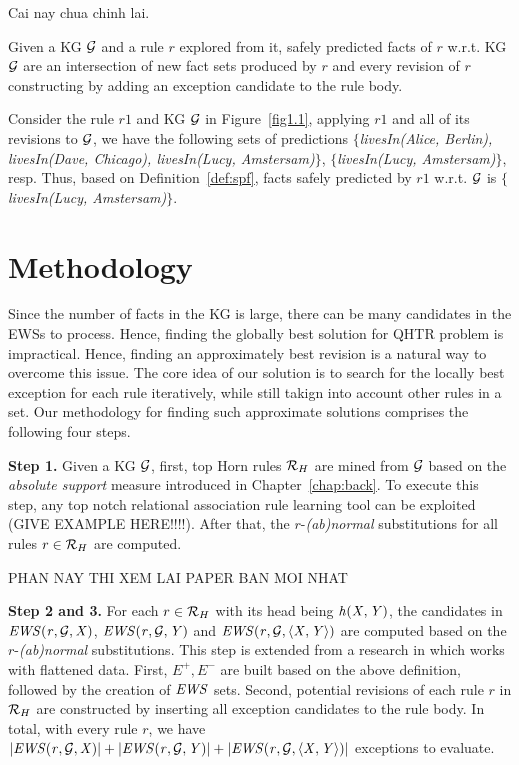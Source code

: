 \begin{definition} \label{def:spf}
Cai nay chua chinh lai.

Given a KG $\mathcal{G}$ and a rule $r$ explored from it, safely predicted facts of $r$ w.r.t. KG $\mathcal{G}$ are an intersection of new fact sets produced by $r$ and every revision of $r$ constructing by adding an exception candidate to the rule body.
\end{definition}

\begin{example}
Consider the rule $r1$ and KG $\mathcal{G}$ in Figure~\ref{fig1.1}, applying $r1$ and all of its revisions to $\mathcal{G}$, we have the following sets of predictions \textit{$\{$livesIn(Alice, Berlin), livesIn(Dave, Chicago), livesIn(Lucy, Amstersam)$\}$}, \textit{$\{$livesIn(Lucy, Amstersam)$\}$}, resp. Thus, based on Definition~\ref{def:spf}, facts safely predicted by $r1$ w.r.t. $\mathcal{G}$ is \textit{$\{$livesIn(Lucy, Amstersam)$\}$}.
\end{example}

\section{Methodology}\label{sec:meth}

Since the number of facts in the KG is large, there can be many candidates in the EWSs to process. Hence, finding the globally best solution for QHTR problem is impractical. Hence, finding an approximately best revision is a natural way to overcome this issue. The core idea of our solution is to search for the locally best exception for each rule iteratively, while still takign into account other rules in a set. Our methodology for finding such approximate solutions comprises the following four steps.
\medskip

\noindent \textbf{Step 1.} Given a KG $\mathcal{G}$, first, top Horn rules $\mathcal{R}_H$ are mined from $\mathcal{G}$ based on the \textit{absolute support} measure introduced in Chapter~\ref{chap:back}. To execute this step, any top notch relational association rule learning tool can be exploited (GIVE EXAMPLE HERE!!!!). After that, the $r$-\emph{(ab)normal} substitutions for all rules $r\in \mathcal{R}_H$ are computed.
\smallskip


PHAN NAY THI XEM LAI PAPER BAN MOI NHAT

\noindent \textbf{Step 2 and 3.} For each $r\in \mathcal{R}_H$ with its head being $\mathit{h(X,Y)}$, the candidates in $\mathit{EWS(r,\mathcal{G},X)}$, $\mathit{EWS(r,\mathcal{G},Y)}$ and $\mathit{EWS(r,\mathcal{G},\langle X,Y\rangle)}$ are computed based on the $r$-\emph{(ab)normal} substitutions. This step is extended from a research in \cite{iswc2016} which works with flattened data. First, $E^+, E^-$ are built based on the above definition, followed by the creation of $\mathit{EWS}$ sets. Second, potential revisions of each rule $r$ in $\mathcal{R}_H$ are constructed by inserting all exception candidates to the rule body. In total, with every rule $r$, we have $|\mathit{EWS(r,\mathcal{G},X)}|+|\mathit{EWS(r,\mathcal{G},Y)}|+|\mathit{EWS(r,\mathcal{G},\langle X,Y\rangle)}|$ exceptions to evaluate.

